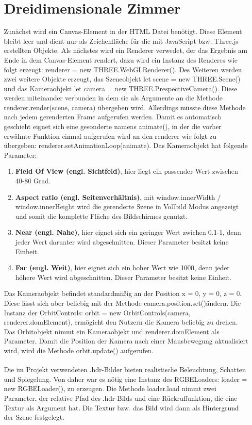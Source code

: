 \section{Dreidimensionale Zimmer}
Zunächst wird ein Canvas-Element in der HTML Datei benötigt. Diese Element bleibt leer und dient nur als Zeichenfläche für die mit JavaScript bzw. Three.js erstellten Objekte. Als nächstes wird ein Renderer verwedet, der das Ergebnis am Ende in dem Canvas-Element rendert, dazu wird ein Instanz des Renderes wie folgt erzeugt: renderer = new THREE.WebGLRenderer(). Des Weiteren werden zwei weitere Objekte erzeugt, das Szeneobjekt let scene = new THREE.Scene() und das Kameraobjekt let camera = new THREE.PrespectiveCamera(). Diese werden miteinander verbunden in dem sie als Argumente an die Methode renderer.render(scene, camera) übergeben wird. Allerdings müsste diese Methode nach jedem gerenderten Frame aufgerufen werden. Damit es automatisch geschieht eignet sich eine gesonderte namens animate(), in der die vorher erwähnte Funktion einmal aufgerufen wird an den renderer wie folgt zu übergeben: renderer.setAnimationLoop(animate).
\newpage
Das Kameraobjekt hat folgende Parameter:
\begin{enumerate}
	\item \textbf{Field Of View (engl. Sichtfeld)}, hier liegt ein passender Wert zwischen 40-80 Grad.
	\item \textbf{Aspect ratio (engl. Seitenverhältnis)}, mit window.innerWidth / window.innerHeight wird die gerenderte Szene in Vollbild Modus angezeigt und somit die komplette Fläche des Bildschirmes genutzt.  
	\item \textbf{Near (engl. Nahe)}, hier eignet sich ein geringer Wert zwichen 0.1-1, denn jeder Wert darunter wird abgeschnitten. Dieser Parameter besitzt keine Einheit. 
	\item \textbf{Far (engl. Weit)}, hier eignet sich ein hoher Wert wie 1000, denn jeder höhere Wert wird abgeschnitten. Dieser Parameter besitzt keine Einheit.
\end{enumerate}
Das Kameraobjekt befindet standardmäßig an der Position x = 0, y = 0, z = 0. Diese lässt sich aber beliebig mit der Methode \glqq camera.position.set()\grqq \thickspace ändern. Die Instanz der OrbitControls: orbit = new OrbitControls(camera, renderer.domElement), ermögicht den Nutzern die Kamera beliebig zu drehen. Das Orbitobjekt nimmt ein Kameraobjekt und renderer.domElement als Parameter. Damit die Position der Kamera nach einer Mausbewegung aktualisiert wird, wird die Methode orbit.update() aufgerufen.
\\
\\
Die im Projekt verwendeten .hdr-Bilder bieten realistische Beleuchtung, Schatten und Spiegelung. Von daher war es nötig eine Instanz des RGBELoaders: loader = new RGBELoader(), zu erzeugen. Die Methode loader.load nimmt zwei Parameter, der relative Pfad des .hdr-Bilds und eine Rückruffunktion, die eine Textur als Argument hat. Die Textur bzw. das Bild wird dann als Hintergrund der Szene festgelegt.
